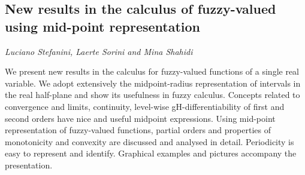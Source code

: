 \documentclass[../booklet.tex]{subfiles}
\begin{document}
\subsection[New results in the calculus of fuzzy-valued using mid-point representation. {\it Luciano Stefanini, Laerte Sorini and Mina Shahidi}]{New results in the calculus of fuzzy-valued using mid-point representation}
  

\begin{center}
  {\it Luciano Stefanini, Laerte Sorini and Mina Shahidi}
\end{center}

\vskip 0.8cm



	We present new results in the calculus for fuzzy-valued functions of a
	single real variable. We adopt extensively the midpoint-radius
	representation of intervals in the real half-plane and show its usefulness
	in fuzzy calculus. Concepts related to convergence and limits, continuity,
	level-wise gH-differentiability of first and second orders have nice and useful midpoint expressions.
	Using mid-point representation of fuzzy-valued functions, partial orders and properties of monotonicity and convexity are discussed and analysed in detail.  Periodicity is easy to represent and identify. Graphical examples and pictures accompany the presentation. 


\end{document}
